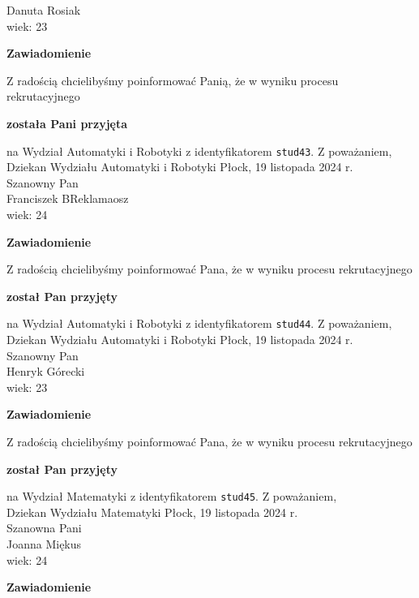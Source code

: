\documentclass[12pt,a4paper]{article}
\begin{document}
Danuta Rosiak \\
wiek: 23
\bigskip
\begin{center}
    {\Large\textbf{Zawiadomienie}}
\end{center}
\bigskip 
Z radością chcielibyśmy poinformować Panią, że w wyniku procesu rekrutacyjnego
\begin{center}
\textsf{\textbf{została Pani przyjęta}}
\end{center}
na Wydział Automatyki i Robotyki z identyfikatorem \verb|stud43|. 
\vspace{2cm}
\noindent
Z poważaniem, \\
Dziekan
Wydziału Automatyki i Robotyki
\newpage
\hfill Płock, 19 listopada 2024 r. \\
\noindent
Szanowny Pan \\
Franciszek BReklamaosz \\
wiek: 24
\bigskip
\begin{center}
    {\Large\textbf{Zawiadomienie}}
\end{center}
\bigskip 
Z radością chcielibyśmy poinformować Pana, że w wyniku procesu rekrutacyjnego
\begin{center}
\textsf{\textbf{został Pan przyjęty}}
\end{center}
na Wydział Automatyki i Robotyki z identyfikatorem \verb|stud44|. 
\vspace{2cm}
\noindent
Z poważaniem, \\
Dziekan
Wydziału Automatyki i Robotyki
\newpage
\hfill Płock, 19 listopada 2024 r. \\
\noindent
Szanowny Pan \\
Henryk Górecki \\
wiek: 23
\bigskip
\begin{center}
    {\Large\textbf{Zawiadomienie}}
\end{center}
\bigskip 
Z radością chcielibyśmy poinformować Pana, że w wyniku procesu rekrutacyjnego
\begin{center}
\textsf{\textbf{został Pan przyjęty}}
\end{center}
na Wydział Matematyki z identyfikatorem \verb|stud45|. 
\vspace{2cm}
\noindent
Z poważaniem, \\
Dziekan
Wydziału Matematyki
\newpage
\hfill Płock, 19 listopada 2024 r. \\
\noindent
Szanowna Pani \\
Joanna Miękus \\
wiek: 24
\bigskip
\begin{center}
    {\Large\textbf{Zawiadomienie}}
\end{center}
\end{document}
